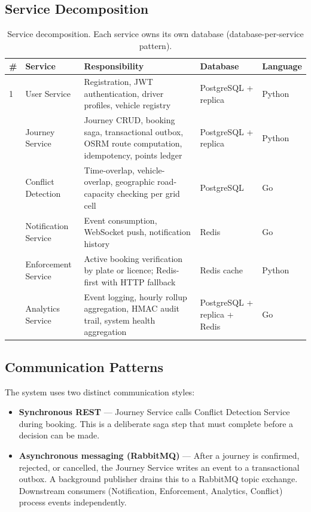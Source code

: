 \documentclass[12pt,a4paper]{article}
\begin{document}
\subsection{Service Decomposition}

\begin{table}[H]
\centering
\small
\begin{tabularx}{\textwidth}{C{0.4cm} L{3cm} X L{2.8cm} C{1.4cm}}
  \toprule
  \textbf{\#} & \textbf{Service} & \textbf{Responsibility} & \textbf{Database} & \textbf{Language} \\
   & User Service        & Registration, JWT authentication, driver profiles, vehicle registry
    & PostgreSQL + replica & Python \\
   & Journey Service     & Journey CRUD, booking saga, transactional outbox, OSRM route computation, idempotency, points ledger
    & PostgreSQL + replica & Python \\
   & Conflict Detection  & Time-overlap, vehicle-overlap, geographic road-capacity checking per grid cell
    & PostgreSQL           & Go \\
   & Notification Service& Event consumption, WebSocket push, notification history
    & Redis                & Go \\
   & Enforcement Service & Active booking verification by plate or licence; Redis-first with HTTP fallback
    & Redis cache          & Python \\
   & Analytics Service   & Event logging, hourly rollup aggregation, HMAC audit trail, system health aggregation
    & PostgreSQL + replica + Redis & Go \\
  \bottomrule
\end{tabularx}
\caption{Service decomposition. Each service owns its own database (database-per-service pattern).}
\end{table}

\subsection{Communication Patterns}

The system uses two distinct communication styles:

\begin{itemize}[leftmargin=*]
  \item \textbf{Synchronous REST} --- Journey Service calls Conflict Detection Service during booking. This is a deliberate saga step that must complete before a decision can be made.
  \item \textbf{Asynchronous messaging (RabbitMQ)} --- After a journey is confirmed, rejected, or cancelled, the Journey Service writes an event to a transactional outbox. A background publisher drains this to a RabbitMQ topic exchange. Downstream consumers (Notification, Enforcement, Analytics, Conflict) process events independently.
\end{itemize}
\end{document}

